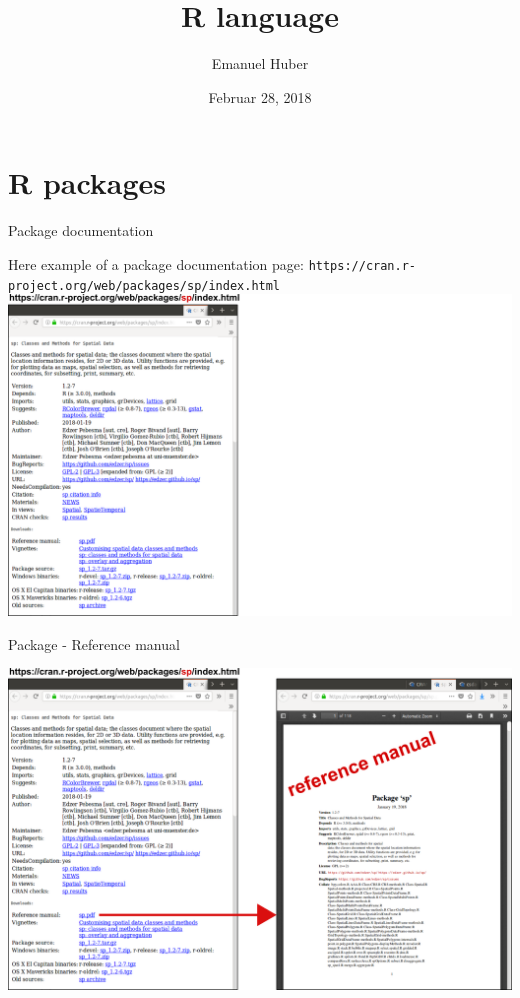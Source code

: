 \documentclass[8pt,ignorenonframetext,]{beamer}
\title{R language}
\author{Emanuel Huber}
\date{Februar 28, 2018}
\begin{document}
\frame{\titlepage}

\section{R packages}\label{r-packages}

\begin{frame}[fragile]{Package documentation}

Here example of a package documentation page:
\texttt{https://cran.r-project.org/web/packages/sp/index.html}
\includegraphics{imgPres/documentation_00.png}

\end{frame}

\begin{frame}{Package - Reference manual}

\includegraphics{imgPres/documentation_01.png}

\end{frame}
\end{document}
